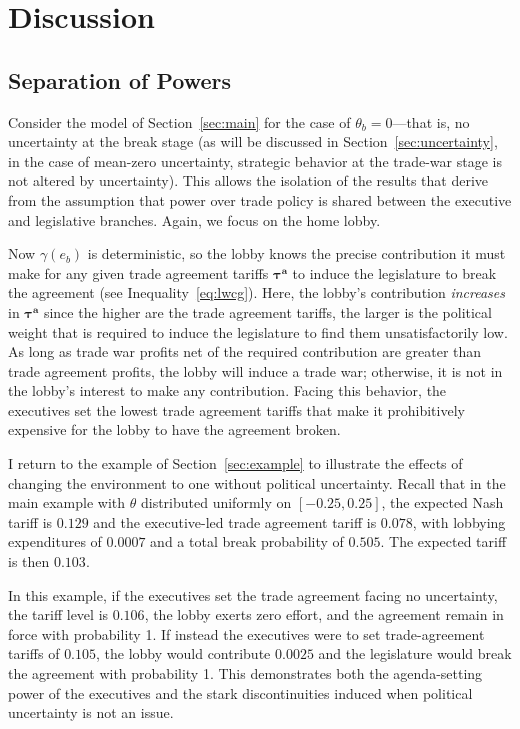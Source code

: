 \documentclass[10pt]{article}
\newcommand{\ve}{\theta}
\newcommand{\bta}{\bm{\tau^a}}
\newcommand{\ga}{\gamma}
\begin{document}
\section{Discussion}
\label{sec:dis}

\subsection{Separation of Powers}
\label{sec:sep_powers}
Consider the model of Section~\ref{sec:main} for the case of $\ve_b=0$---that is, no uncertainty at the break stage (as will be discussed in Section~\ref{sec:uncertainty}, in the case of mean-zero uncertainty, strategic behavior at the trade-war stage is not altered by uncertainty). This allows the isolation of the results that derive from the assumption that power over trade policy is shared between the executive and legislative branches. Again, we focus on the home lobby.

Now $\ga(e_b)$ is deterministic, so the lobby knows the precise contribution it must make for any given trade agreement tariffs $\bta$ to induce the legislature to break the agreement (see Inequality~\ref{eq:lwcg}). Here, the lobby's contribution \textit{increases} in $\bta$ since the higher are the trade agreement tariffs, the larger is the political weight that is required to induce the legislature to find them unsatisfactorily low. As long as trade war profits net of the required contribution are greater than trade agreement profits, the lobby will induce a trade war; otherwise, it is not in the lobby's interest to make any contribution. Facing this behavior, the executives set the lowest trade agreement tariffs that make it prohibitively expensive for the lobby to have the agreement broken.

I return to the example of Section~\ref{sec:example} to illustrate the effects of changing the environment to one without political uncertainty. Recall that in the main example with $\ve$ distributed uniformly on $[-0.25,0.25]$, the expected Nash tariff is $0.129$ and the executive-led trade agreement tariff is $0.078$, with lobbying expenditures of $0.0007$ and a total break probability of $0.505$. The expected tariff is then $0.103$.

In this example, if the executives set the trade agreement facing no uncertainty, the tariff level is $0.106$, the lobby exerts zero effort, and the agreement remain in force with probability 1. If instead the executives were to set trade-agreement tariffs of $0.105$, the lobby would contribute $0.0025$ and the legislature would break the agreement with probability 1. This demonstrates both the agenda-setting power of the executives and the stark discontinuities induced when political uncertainty is not an issue.
\end{document}
